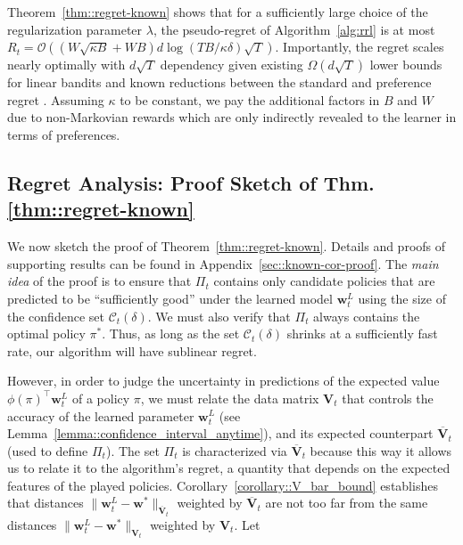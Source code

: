 \begin{rem}
Theorem~\ref{thm::regret-known} shows that for a sufficiently large choice of the regularization parameter $\lambda$, the pseudo-regret of Algorithm~\ref{alg:rrl} is at most $R_t = {\mathcal{O}} \left( \left( W\sqrt{ \kappa B}   + W B\right)  d  \log (TB /\kappa \delta) \sqrt{T}  \right)$. Importantly, the regret  scales nearly optimally with $ d \sqrt T$ dependency given existing $\Omega(d\sqrt{T})$ lower bounds for linear bandits \citep{lattimore2020bandit} and known reductions between the standard and preference regret \cite{saha2021optimal}.  Assuming $\kappa$ to be constant, we pay the additional factors in $B$ and $W$ due to non-Markovian rewards which are only indirectly revealed to the learner in terms of preferences. 
\end{rem}

\subsection{Regret Analysis: Proof Sketch of Thm. \ref{thm::regret-known}}
We now sketch the proof of Theorem~\ref{thm::regret-known}. Details and proofs of supporting results can be found in Appendix~\ref{sec::known-cor-proof}. The \emph{main idea} of the proof is to ensure that $\Pi_t$ contains only candidate policies that are predicted to be ``sufficiently good'' under the learned model ${\mathbf w}_t^L$ using the size of the confidence set $\mathcal C_t(\delta)$. We must also verify that $\Pi_t$ always contains the optimal policy $\pi^*$. Thus, as long as the set $\mathcal C_t(\delta)$ shrinks at a sufficiently fast rate, our algorithm will have sublinear regret.

However, in order to judge the uncertainty in predictions of the expected value $\phi(\pi)^\top {\mathbf w}_t^L$ of a policy $\pi$, we must relate the data matrix ${\mathbf V}_t$ that controls the accuracy of the learned parameter ${\mathbf w}_t^L$ (see Lemma~\ref{lemma::confidence_interval_anytime}), and its expected counterpart $\overline {\mathbf V}_t$ (used to define $\Pi_t$). The set $\Pi_t$ is characterized via $\overline {\mathbf V}_t$ because this way it allows us to relate it to the algorithm's regret, a quantity that depends on the expected features of the played policies.  Corollary~\ref{corollary::V_bar_bound} establishes that distances $\|{\mathbf w}_t^L - {\mathbf w}^* \|_{\overline {\mathbf V}_t}$ weighted by $\overline {\mathbf V}_t$ are not too far from the same distances $\|  {\mathbf w}_t^L - {\mathbf w}^* \|_{ {\mathbf V}_t}$ weighted by ${\mathbf V}_t$. Let

